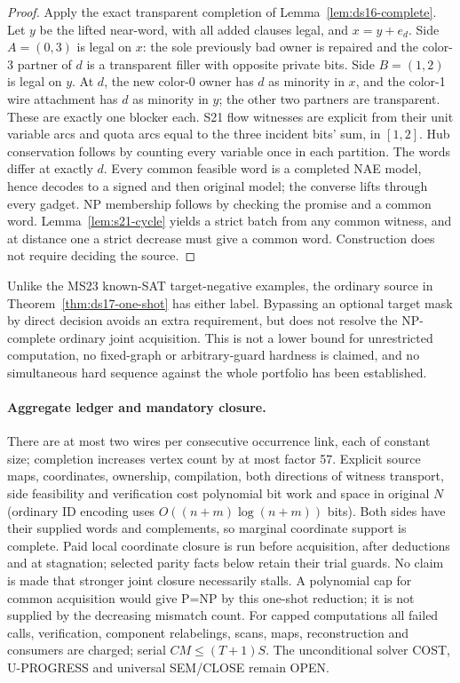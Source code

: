 \documentclass[11pt]{article}
\begin{document}
\begin{proof}
Apply the exact transparent completion of Lemma~\ref{lem:ds16-complete}. Let $y$ be the lifted near-word, with all added clauses legal, and $x=y+e_d$. Side $A=(0,3)$ is legal on $x$: the sole previously bad owner is repaired and the color-3 partner of $d$ is a transparent filler with opposite private bits. Side $B=(1,2)$ is legal on $y$. At $d$, the new color-0 owner has $d$ as minority in $x$, and the color-1 wire attachment has $d$ as minority in $y$; the other two partners are transparent. These are exactly one blocker each. S21 flow witnesses are explicit from their unit variable arcs and quota arcs equal to the three incident bits' sum, in $[1,2]$. Hub conservation follows by counting every variable once in each partition. The words differ at exactly $d$. Every common feasible word is a completed NAE model, hence decodes to a signed and then original model; the converse lifts through every gadget. NP membership follows by checking the promise and a common word. Lemma~\ref{lem:s21-cycle} yields a strict batch from any common witness, and at distance one a strict decrease must give a common word. Construction does not require deciding the source.
\end{proof}
Unlike the MS23 known-SAT target-negative examples, the ordinary source in Theorem~\ref{thm:ds17-one-shot} has either label. Bypassing an optional target mask by direct decision avoids an extra requirement, but does not resolve the NP-complete ordinary joint acquisition. This is not a lower bound for unrestricted computation, no fixed-graph or arbitrary-guard hardness is claimed, and no simultaneous hard sequence against the whole portfolio has been established.

\paragraph{Aggregate ledger and mandatory closure.}
There are at most two wires per consecutive occurrence link, each of constant size; completion increases vertex count by at most factor 57. Explicit source maps, coordinates, ownership, compilation, both directions of witness transport, side feasibility and verification cost polynomial bit work and space in original $N$ (ordinary ID encoding uses $O((n+m)\log(n+m))$ bits). Both sides have their supplied words and complements, so marginal coordinate support is complete. Paid local coordinate closure is run before acquisition, after deductions and at stagnation; selected parity facts below retain their trial guards. No claim is made that stronger joint closure necessarily stalls. A polynomial cap for common acquisition would give P=NP by this one-shot reduction; it is not supplied by the decreasing mismatch count. For capped computations all failed calls, verification, component relabelings, scans, maps, reconstruction and consumers are charged; serial $CM\le(T+1)S$. The unconditional solver COST, U-PROGRESS and universal SEM/CLOSE remain OPEN.
\end{document}
